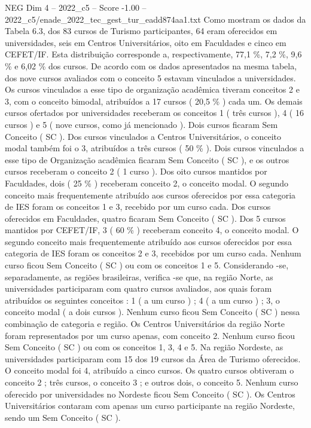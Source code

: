\begin{textsample}{NEG Dim 4 – 2022\_c5 – Score -1.00 – 2022\_c5/enade\_2022\_tec\_gest\_tur\_eadd874aa1.txt}
Como mostram os dados da Tabela 6.3, dos 83 cursos de Turismo participantes, 64 eram oferecidos em universidades, seis em Centros Universitários, oito em Faculdades e cinco em CEFET/IF.
Esta distribuição corresponde a, respectivamente, 77,1 \%, 7,2 \%, 9,6 \% e 6,02 \% dos cursos.
De acordo com os dados apresentados na mesma tabela, dos nove cursos avaliados com o conceito 5 estavam vinculados a universidades.
Os cursos vinculados a esse tipo de organização acadêmica tiveram conceitos 2 e 3, com o conceito bimodal, atribuídos a 17 cursos ( 20,5 \% ) cada um.
Os demais cursos ofertados por universidades receberam os conceitos 1 ( três cursos ), 4 ( 16 cursos ) e 5 ( nove cursos, como já mencionado ).
Dois cursos ficaram Sem Conceito ( SC ).
Dos cursos vinculados a Centros Universitários, o conceito modal também foi o 3, atribuídos a três cursos ( 50 \% ).
Dois cursos vinculados a esse tipo de Organização acadêmica ficaram Sem Conceito ( SC ), e os outros cursos receberam o conceito 2 ( 1 curso ).
Dos oito cursos mantidos por Faculdades, dois ( 25 \% ) receberam conceito 2, o conceito modal.
O segundo conceito mais frequentemente atribuído aos cursos oferecidos por essa categoria de IES foram os conceitos 1 e 3, recebido por um curso cada.
Dos cursos oferecidos em Faculdades, quatro ficaram Sem Conceito ( SC ).
Dos 5 cursos mantidos por CEFET/IF, 3 ( 60 \% ) receberam conceito 4, o conceito modal.
O segundo conceito mais frequentemente atribuído aos cursos oferecidos por essa categoria de IES foram os conceitos 2 e 3, recebidos por um curso cada.
Nenhum curso ficou Sem Conceito ( SC ) ou com os conceitos 1 e 5.
Considerando -se, separadamente, as regiões brasileiras, verifica -se que, na região Norte, as universidades participaram com quatro cursos avaliados, aos quais foram atribuídos os seguintes conceitos : 1 ( a um curso ) ; 4 ( a um curso ) ; 3, o conceito modal ( a dois cursos ).
Nenhum curso ficou Sem Conceito ( SC ) nessa combinação de categoria e região.
Os Centros Universitários da região Norte foram representados por um curso apenas, com conceito 2.
Nenhum curso ficou Sem Conceito ( SC ) ou com os conceitos 1, 3, 4 e 5.
Na região Nordeste, as universidades participaram com 15 dos 19 cursos da Área de Turismo oferecidos.
O conceito modal foi 4, atribuído a cinco cursos.
Os quatro cursos obtiveram o conceito 2 ; três cursos, o conceito 3 ; e outros dois, o conceito 5.
Nenhum curso oferecido por universidades no Nordeste ficou Sem Conceito ( SC ).
Os Centros Universitários contaram com apenas um curso participante na região Nordeste, sendo um Sem Conceito ( SC ).

\end{textsample}
